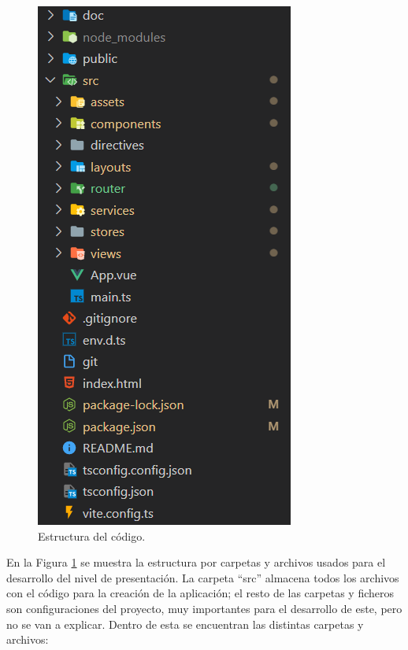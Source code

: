 
\begin{figure}[htbp]
\centering
\includegraphics[scale=0.65]{Graphics/code}
\caption{Estructura del código.}
\label{fig:code}
\end{figure}

En la Figura \ref{fig:code} se muestra la estructura por carpetas y archivos usados para el desarrollo del nivel de presentación. La carpeta ``src'' almacena todos los archivos con el código para la creación de la aplicación; el resto de las carpetas y ficheros son configuraciones del proyecto, muy importantes para el desarrollo de este, pero no se van a explicar. Dentro de esta se encuentran las distintas carpetas y archivos:

